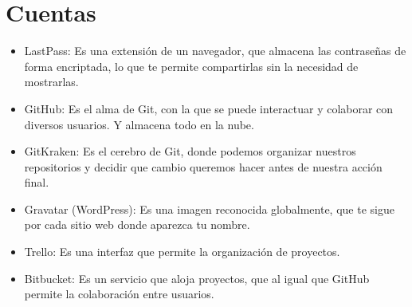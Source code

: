 \documentclass[12pt,letterpaper]{article}
\begin{document}
\section*{Cuentas}
\begin{itemize}
\item LastPass: Es una extensión de un navegador, que almacena las contraseñas de forma encriptada, lo que te permite compartirlas sin la necesidad de mostrarlas.
\item GitHub: Es el alma de Git, con la que se puede interactuar y colaborar con diversos usuarios. Y almacena todo en la nube.
\item GitKraken: Es el cerebro de Git, donde podemos organizar nuestros repositorios y decidir que cambio queremos hacer antes de nuestra acción final.
\item Gravatar (WordPress): Es una imagen reconocida globalmente, que te sigue por cada sitio web donde aparezca tu nombre.
\item Trello: Es una interfaz que permite la organización de proyectos.
\item Bitbucket: Es un servicio que aloja proyectos, que al igual que GitHub permite la colaboración entre usuarios.
\end{itemize}

 

\end{document}
